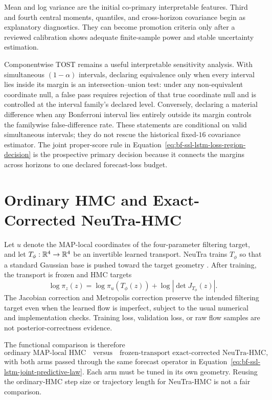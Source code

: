 Mean and log variance are the initial co-primary interpretable features.
Third and fourth central moments, quantiles, and cross-horizon covariance begin
as explanatory diagnostics.  They can become promotion criteria only after a
reviewed calibration shows adequate finite-sample power and stable uncertainty
estimation.

Componentwise TOST remains a useful interpretable sensitivity analysis.  With
simultaneous $(1-\alpha)$ intervals, declaring equivalence only when every
interval lies inside its margin is an intersection--union test: under any
non-equivalent coordinate null, a false pass requires rejection of that true
coordinate null and is controlled at the interval family's declared level.
Conversely, declaring a material difference when any Bonferroni interval lies
entirely outside its margin controls the familywise false-difference rate.
These statements are conditional on valid simultaneous intervals; they do not
rescue the historical fixed-$16$ covariance estimator.  The joint
proper-score rule in Equation~\eqref{eq:bf-ssl-lstm-loss-region-decision} is the
prospective primary decision because it connects the margins across horizons
to one declared forecast-loss budget.

\section{Ordinary HMC and Exact-Corrected NeuTra-HMC}
\label{sec:bf-ssl-lstm-neutra-comparison}

Let $u$ denote the MAP-local coordinates of the four-parameter filtering
target, and let $T_\phi:\mathbb{R}^4\rightarrow\mathbb{R}^4$ be an invertible learned
transport.  NeuTra trains $T_\phi$ so that a standard Gaussian base is pushed
toward the target geometry \citep{hoffman2019neutra}.  After training, the
transport is frozen and HMC targets
\begin{equation}
  \log\pi_z(z)
  =\log\pi_u(T_\phi(z))
   +\log\left|\det J_{T_\phi}(z)\right|.
  \label{eq:bf-ssl-lstm-exact-neutra-target}
\end{equation}
The Jacobian correction and Metropolis correction preserve the intended
filtering target even when the learned flow is imperfect, subject to the usual
numerical and implementation checks.  Training loss, validation loss, or raw
flow samples are not posterior-correctness evidence.

The functional comparison is therefore
\begin{equation}
  \text{ordinary MAP-local HMC}
  \quad\text{versus}\quad
  \text{frozen-transport exact-corrected NeuTra-HMC},
  \label{eq:bf-ssl-lstm-sampler-comparison}
\end{equation}
with both arms passed through the same forecast operator in
Equation~\eqref{eq:bf-ssl-lstm-joint-predictive-law}.  Each arm must be tuned
in its own geometry.  Reusing the ordinary-HMC step size or trajectory length
for NeuTra-HMC is not a fair comparison.

